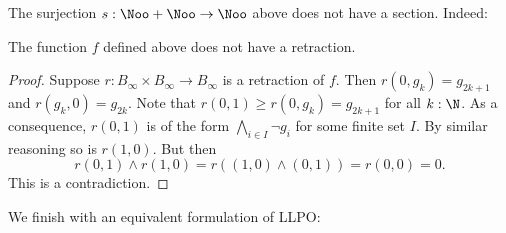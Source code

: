 The surjection $s:\Noo + \Noo \to \Noo$ above does not have a section. Indeed:
\begin{lemma}
  The function $f$ defined above does not have a retraction. 
\end{lemma}
\begin{proof}
  Suppose $r:B_\infty \times B_\infty \to B_\infty$ is a retraction of $f$. 
  Then $r(0,g_k) = g_{2k+1}$ and $r(g_k,0) = g_{2k}$. 
  Note that $r(0,1) \geq r(0,g_k) = g_{2k+1}$ for all $k:\N$. 
  As a consequence, $r(0,1)$ is of the form $\bigwedge_{i\in I} \neg g_i$ for some finite set $I$.
  By similar reasoning so is $r(1,0)$. %
  But then %
  \[r(0,1) \wedge r(1,0) = r( (1,0) \wedge (0,1)) = r(0,0) = 0.\]
  This is a contradiction.
\end{proof}


We finish with an equivalent formulation of LLPO:


